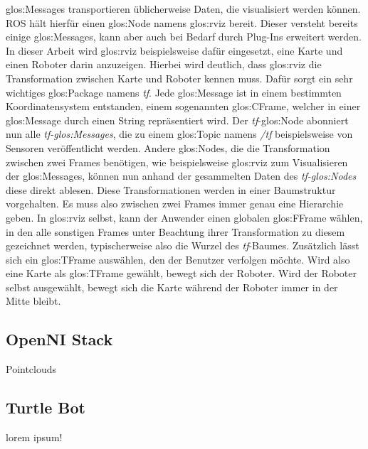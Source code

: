 \glspl{glos:Message} transportieren üblicherweise Daten, die visualisiert werden können. \gls{ROS} hält hierfür einen \gls{glos:Node} namens \gls{glos:rviz} bereit. Dieser versteht bereits einige \glspl{glos:Message}, kann aber auch bei Bedarf durch Plug-Ins erweitert werden. In dieser Arbeit wird \gls{glos:rviz} beispielsweise dafür eingesetzt, eine Karte und einen Roboter darin anzuzeigen. Hierbei wird deutlich, dass \gls{glos:rviz} die Transformation zwischen Karte und Roboter kennen muss. Dafür sorgt ein sehr wichtiges \gls{glos:Package} namens \emph{tf}. Jede \gls{glos:Message} ist in einem bestimmten Koordinatensystem entstanden, einem sogenannten \gls{glos:CFrame}, welcher in einer \gls{glos:Message} durch einen String repräsentiert wird. Der \emph{tf}-\gls{glos:Node} abonniert nun alle \emph{tf-\glspl{glos:Message}}, die zu einem \gls{glos:Topic} namens \emph{/tf} beispielsweise von Sensoren veröffentlicht werden. Andere \glspl{glos:Node}, die die Transformation zwischen zwei \glspl{Frame} benötigen, wie beispielsweise \gls{glos:rviz} zum Visualisieren der \glspl{glos:Message}, können nun anhand der gesammelten Daten des \emph{tf-\glspl{glos:Node}} diese direkt ablesen. Diese Transformationen werden in einer Baumstruktur vorgehalten. Es muss also zwischen zwei \glspl{Frame} immer genau eine Hierarchie geben. In \gls{glos:rviz} selbst, kann der Anwender einen globalen \gls{glos:FFrame} wählen, in den alle sonstigen \glspl{Frame} unter Beachtung ihrer Transformation zu diesem gezeichnet werden, typischerweise also die Wurzel des \emph{tf}-Baumes. Zusätzlich lässt sich ein \gls{glos:TFrame} auswählen, den der Benutzer verfolgen möchte. Wird also eine Karte als \gls{glos:TFrame} gewählt, bewegt sich der Roboter. Wird der Roboter selbst ausgewählt, bewegt sich die Karte während der Roboter immer in der Mitte bleibt.

\subsection{OpenNI Stack}
{\color{red}Pointclouds}


\subsection{Turtle Bot}
{\color{red}lorem ipsum!}